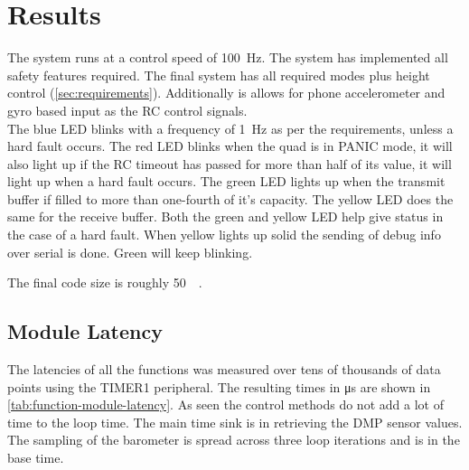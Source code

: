 \documentclass[final]{article}
\begin{document}
\section{Results}




The system runs at a control speed of \SI{100}{\hertz}.
The system has implemented all safety features required.
The final system has all required modes plus height control (\cref{sec:requirements}).
Additionally is allows for phone accelerometer and gyro based input as the RC control signals.\\
The blue LED blinks with a frequency of \SI{1}{\hertz} as per the requirements, unless a hard fault occurs.
The red LED blinks when the quad is in PANIC mode, it will also light up if the RC timeout has passed for more than half of its value, it will light up when a hard fault occurs.
The green LED lights up when the transmit buffer if filled to more than one-fourth of it's capacity.
The yellow LED does the same for the receive buffer.
Both the green and yellow LED help give status in the case of a hard fault.
When yellow lights up solid the sending of debug info over serial is done.
Green will keep blinking.

The final code size is roughly \SI{50}{\kilo\byte}.



\subsection{Module Latency}
\label{ssec:module-latency}
The latencies of all the functions was measured over tens of thousands of data points using the TIMER1 peripheral.
The resulting times in \si{\micro\second} are shown in \cref{tab:function-module-latency}.
As seen the control methods do not add a lot of time to the loop time.
The main time sink is in retrieving the DMP sensor values.
The sampling of the barometer is spread across three loop iterations and is in the base time.
\end{document}
